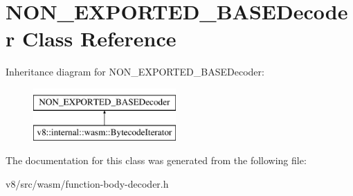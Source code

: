 \hypertarget{classNON__EXPORTED__BASEDecoder}{}\section{N\+O\+N\+\_\+\+E\+X\+P\+O\+R\+T\+E\+D\+\_\+\+B\+A\+S\+E\+Decoder Class Reference}
\label{classNON__EXPORTED__BASEDecoder}
Inheritance diagram for N\+O\+N\+\_\+\+E\+X\+P\+O\+R\+T\+E\+D\+\_\+\+B\+A\+S\+E\+Decoder\+:\begin{figure}[H]
\begin{center}
\leavevmode
\includegraphics[height=2.000000cm]{classNON__EXPORTED__BASEDecoder}
\end{center}
\end{figure}


The documentation for this class was generated from the following file\+:\begin{DoxyCompactItemize}
\item 
v8/src/wasm/function-\/body-\/decoder.\+h\end{DoxyCompactItemize}

